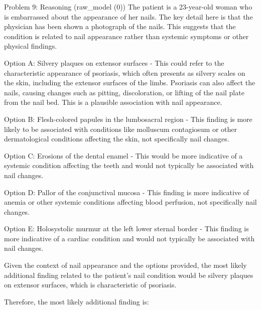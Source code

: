 \documentclass{beamer}
\begin{document}
\begin{frame}[allowframebreaks]{Problem 9: Reasoning (raw\_model (0))}
    \small The patient is a 23-year-old woman who is embarrassed about the appearance of her nails. The key detail here is that the physician has been shown a photograph of the nails. This suggests that the condition is related to nail appearance rather than systemic symptoms or other physical findings.

\medskip
Option A: Silvery plaques on extensor surfaces - This could refer to the characteristic appearance of psoriasis, which often presents as silvery scales on the skin, including the extensor surfaces of the limbs. Psoriasis can also affect the nails, causing changes such as pitting, discoloration, or lifting of the nail plate from the nail bed. This is a plausible association with nail appearance.

\medskip
Option B: Flesh-colored papules in the lumbosacral region - This finding is more likely to be associated with conditions like molluscum contagiosum or other dermatological conditions affecting the skin, not specifically nail changes.

\medskip
Option C: Erosions of the dental enamel - This would be more indicative of a systemic condition affecting the teeth and would not typically be associated with nail changes.

\medskip
Option D: Pallor of the conjunctival mucosa - This finding is more indicative of anemia or other systemic conditions affecting blood perfusion, not specifically nail changes.

\medskip
Option E: Holosystolic murmur at the left lower sternal border - This finding is more indicative of a cardiac condition and would not typically be associated with nail changes.

\medskip
Given the context of nail appearance and the options provided, the most likely additional finding related to the patient's nail condition would be silvery plaques on extensor surfaces, which is characteristic of psoriasis.

\medskip
Therefore, the most likely additional finding is:
\end{frame}
\end{document}
